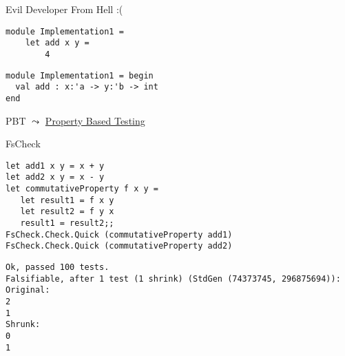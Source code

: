\documentclass[t]{beamer}
\begin{document}
\begin{frame}[label={sec:org4e831c2},fragile]{Evil Developer From Hell :(}
 \begin{verbatim}
module Implementation1 =
    let add x y =
        4
\end{verbatim}

\begin{verbatim}
module Implementation1 = begin
  val add : x:'a -> y:'b -> int
end
\end{verbatim}
\end{frame}

\begin{frame}[label={sec:org8e95741}]{PBT}
\(\leadsto\) \href{./4.2 An introduction to property based testing.pdf}{Property Based Testing}
\end{frame}

\begin{frame}[label={sec:orgc5a950b},fragile]{FsCheck}
 \begin{verbatim}
let add1 x y = x + y
let add2 x y = x - y
let commutativeProperty f x y =
   let result1 = f x y
   let result2 = f y x
   result1 = result2;;
FsCheck.Check.Quick (commutativeProperty add1)
FsCheck.Check.Quick (commutativeProperty add2)
\end{verbatim}

\begin{verbatim}
Ok, passed 100 tests.
Falsifiable, after 1 test (1 shrink) (StdGen (74373745, 296875694)):
Original:
2
1
Shrunk:
0
1
\end{verbatim}
\end{frame}
\end{document}
